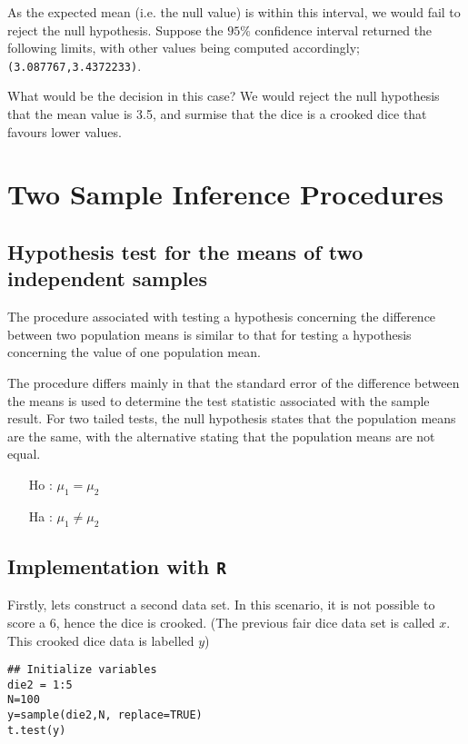 \documentclass[a4paper,12pt]{article}
\begin{document}
As the expected mean (i.e. the null value) is within this interval, we would fail to reject the null hypothesis.
Suppose the $95\%$ confidence interval returned the following limits, with other values being computed accordingly; \texttt{(3.087767,3.4372233)}.

What would be the decision in this case? We would reject the null hypothesis that the mean value is 3.5, and surmise that the dice is a crooked dice that favours lower values.


\newpage
\section{Two Sample Inference Procedures}
\subsection{Hypothesis test for the means of two independent samples}
The procedure associated with testing a hypothesis concerning the difference between two population means is similar to that for testing a hypothesis concerning the value of one population mean.

The procedure differs mainly in that the standard error of the difference between the means is used to determine the test statistic associated with the sample result. For two tailed tests, the null hypothesis states that the population means are the same, with the alternative stating that the population means are not equal.

       \begin{itemize}
       \item[Ho] : $\mu_1 = \mu_2$
       \item[Ha] : $\mu_1 \neq \mu_2$
       \end{itemize}

\subsection{Implementation with \texttt{R}}
Firstly, lets construct a second data set. In this scenario, it is not possible to score a 6, hence the dice is crooked.
(The previous fair dice data set is called $x$. This crooked dice data is labelled $y$)
\begin{framed}
\begin{verbatim}
## Initialize variables
die2 = 1:5
N=100
y=sample(die2,N, replace=TRUE)
t.test(y)
\end{verbatim}
\end{framed}
\end{document}

